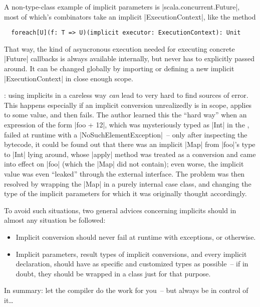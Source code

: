 A non-type-class example of implicit parameters is |scala.concurrent.Future|, most of which's
combinators take an implicit |ExecutionContext|, like the method
\begin{lstlisting}
  foreach[U](f: T => U)(implicit executor: ExecutionContext): Unit  
\end{lstlisting}
That way, the kind of asyncronous execution needed for executing concrete |Future| callbacks is
always available internally, but never has to explicitly passed around. It can be changed globally
by importing or defining a new implicit |ExecutionContext| in close enough scope.
\enlargethispage{1em}

: using implicits in a careless way \emph{can} lead to very
hard to find sources of error. This happens especially if an implicit conversion unrealizedly is in
scope, applies to some value, and then fails. The author learned this the \enquote{hard way} when an
expression of the form |foo + 12|, which was mysteriously typed as |Int| in the , failed
at runtime with a |NoSuchElementException|~-- only after inspecting the bytecode, it could be found
out that there was an implicit |Map| from |foo|'s type to |Int| lying around, whose |apply| method
was treated as a conversion and came into effect on |foo| (which the |Map| did not contain); even
worse, the implicit value was even \enquote{leaked} through the external interface. The problem was
then resolved by wrapping the |Map| in a purely internal case class, and changing the type of the
implicit parameters for which it was originally thought accordingly.

To avoid such situations, two general advices concerning implicits should in almost any situation be
followed:
\begin{itemize}
\item Implicit conversion should never fail at runtime with exceptions, or otherwise.
\item Implicit parameters, result types of implicit conversions, and every implicit declaration,
  should have as specific and customized types as possible~-- if in doubt, they should be wrapped in
  a class just for that purpose.
\end{itemize}
In summary: let the compiler do the work for you~-- but always be in control of it\ldots


